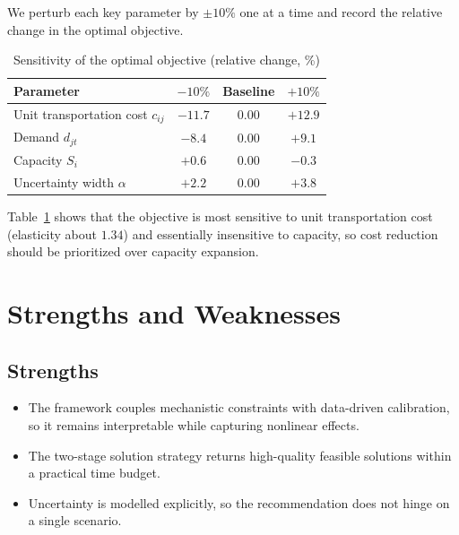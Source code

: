 \documentclass[12pt]{article}
\begin{document}
We perturb each key parameter by $\pm 10\%$ one at a time and record the relative change
in the optimal objective.

\begin{table}[htbp]
  \centering
  \caption{Sensitivity of the optimal objective (relative change, \%)}
  \label{tab:sensitivity}
  \begin{tabular}{lccc}
    \toprule
    \textbf{Parameter} & \textbf{$-10\%$} & \textbf{Baseline} & \textbf{$+10\%$} \\
    \midrule
    Unit transportation cost $c_{ij}$ & $-11.7$ & $0.00$ & $+12.9$ \\
    Demand $d_{jt}$                   & $-8.4$  & $0.00$ & $+9.1$  \\
    Capacity $S_i$                    & $+0.6$  & $0.00$ & $-0.3$  \\
    Uncertainty width $\alpha$        & $+2.2$  & $0.00$ & $+3.8$  \\
    \bottomrule
  \end{tabular}
\end{table}

Table~\ref{tab:sensitivity} shows that the objective is most sensitive to unit
transportation cost (elasticity about $1.34$) and essentially insensitive to capacity,
so cost reduction should be prioritized over capacity expansion.

\section{Strengths and Weaknesses}
\label{sec:strengths}

\subsection{Strengths}
\begin{itemize}
  \item The framework couples mechanistic constraints with data-driven calibration,
        so it remains interpretable while capturing nonlinear effects.
  \item The two-stage solution strategy returns high-quality feasible solutions within
        a practical time budget.
  \item Uncertainty is modelled explicitly, so the recommendation does not hinge on a
        single scenario.
\end{itemize}
\end{document}
